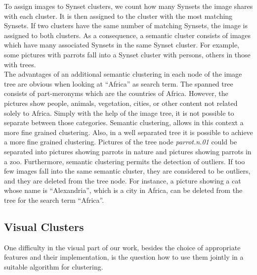 \bigskip
To assign images to Synset clusters, we count how many Synsets the image shares with each cluster. It is then assigned to the cluster with the most matching Synsets. If two clusters have the same number of matching Synsets, the image is assigned to both clusters. As a consequence, a semantic cluster consists of images which have many associated Synsets in the same Synset cluster. For example, some pictures with parrots fall into a Synset cluster with persons, others in those with trees.\\

\bigskip
The advantages of an additional semantic clustering in each node of the image tree are obvious when looking at ``Africa'' as search term. The spanned tree consists of part-meronyms which are the countries of Africa. However, the pictures show people, animals, vegetation, cities, or other content not related solely to Africa. Simply with the help of the image tree, it is not possible to separate between those categories. Semantic clustering, allows in this context a more fine grained clustering. Also, in a well separated tree it is possible to achieve a more fine grained clustering. Pictures of the tree node \emph{parrot.n.01} could be separated into pictures showing parrots in nature and pictures showing parrots in a zoo. Furthermore, semantic clustering permits the detection of outliers. If too few images fall into the same semantic cluster, they are considered to be outliers, and they are deleted from the tree node. For instance, a picture showing a cat whose name is ``Alexandria'', which is a city in Africa, can be deleted from the tree for the search term ``Africa''.

\subsection{Visual Clusters}
\label{sec_visualclustering}

One difficulty in the visual part of our work, besides the choice of appropriate features and their implementation, is the question how to use them jointly in a suitable algorithm for clustering.

